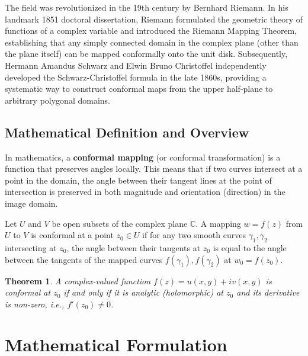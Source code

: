 \documentclass[12pt,a4paper]{article}
\newtheorem{theorem}{Theorem}[section]
\begin{document}
The field was revolutionized in the 19th century by Bernhard Riemann. In his landmark 1851 doctoral dissertation, Riemann formulated the geometric theory of functions of a complex variable and introduced the Riemann Mapping Theorem, establishing that any simply connected domain in the complex plane (other than the plane itself) can be mapped conformally onto the unit disk. Subsequently, Hermann Amandus Schwarz and Elwin Bruno Christoffel independently developed the Schwarz-Christoffel formula in the late 1860s, providing a systematic way to construct conformal maps from the upper half-plane to arbitrary polygonal domains.

\subsection{Mathematical Definition and Overview}
In mathematics, a \textbf{conformal mapping} (or conformal transformation) is a function that preserves angles locally. This means that if two curves intersect at a point in the domain, the angle between their tangent lines at the point of intersection is preserved in both magnitude and orientation (direction) in the image domain.

Let $U$ and $V$ be open subsets of the complex plane $\mathbb{C}$. A mapping $w = f(z)$ from $U$ to $V$ is conformal at a point $z_0 \in U$ if for any two smooth curves $\gamma_1, \gamma_2$ intersecting at $z_0$, the angle between their tangents at $z_0$ is equal to the angle between the tangents of the mapped curves $f(\gamma_1), f(\gamma_2)$ at $w_0 = f(z_0)$.

\begin{theorem}
A complex-valued function $f(z) = u(x,y) + iv(x,y)$ is conformal at $z_0$ if and only if it is analytic (holomorphic) at $z_0$ and its derivative is non-zero, i.e., $f'(z_0) \neq 0$.
\end{theorem}

\section{Mathematical Formulation}
\end{document}
